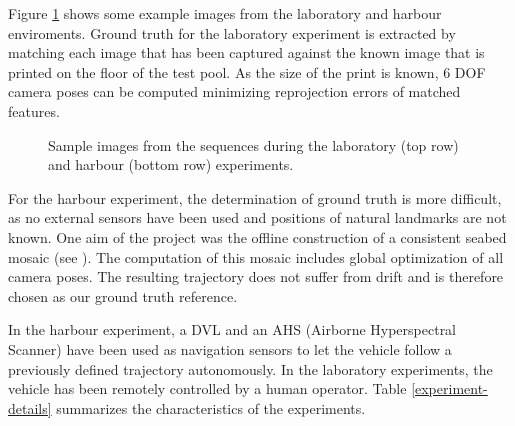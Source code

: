 \documentclass[conference]{IEEEtran}
\begin{document}

Figure \ref{sample-images} shows some example images from the laboratory and harbour enviroments. Ground truth for the laboratory experiment is extracted by matching each image that has been captured against the known image that is printed on the floor of the test pool. As the size of the print is known, 6 DOF camera poses can be computed minimizing reprojection errors of matched features.

\begin{figure}
  \noindent{}
  \caption{Sample images from the sequences during the laboratory (top row) and harbour (bottom row) experiments.}
  \label{sample-images}
\end{figure}

For the harbour experiment, the determination of ground truth is more difficult, as no external sensors have been used and positions of natural landmarks are not known. One aim of the project was the offline construction of a consistent seabed mosaic (see \cite{Ferrer2007}). The computation of this mosaic includes global optimization of all camera poses. The resulting trajectory does not suffer from drift and is therefore chosen as our ground truth reference.

In the harbour experiment, a DVL and an AHS (Airborne Hyperspectral Scanner) have been used as navigation sensors to let the vehicle follow a previously defined trajectory autonomously. In the laboratory experiments, the vehicle has been remotely controlled by a human operator. Table \ref{experiment-details} summarizes the characteristics of the experiments.
\end{document}

